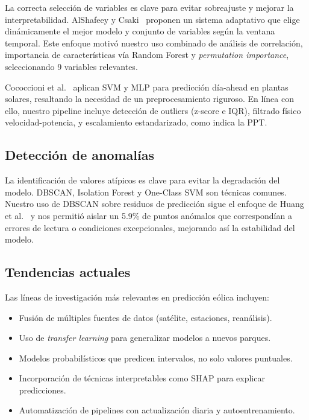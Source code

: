 \documentclass[conference]{IEEEtran}
\begin{document}
	La correcta selección de variables es clave para evitar sobreajuste y mejorar la interpretabilidad. AlShafeey y Csaki~\cite{alshafeey2024adaptive} proponen un sistema adaptativo que elige dinámicamente el mejor modelo y conjunto de variables según la ventana temporal. Este enfoque motivó nuestro uso combinado de análisis de correlación, importancia de características vía Random Forest y \textit{permutation importance}, seleccionando 9 variables relevantes.
	
	Cococcioni et al.~\cite{cococcioni2012oneday} aplican SVM y MLP para predicción día-ahead en plantas solares, resaltando la necesidad de un preprocesamiento riguroso. En línea con ello, nuestro pipeline incluye detección de outliers (z-score e IQR), filtrado físico velocidad-potencia, y escalamiento estandarizado, como indica la PPT.
	
	\subsection{Detección de anomalías}
	
	La identificación de valores atípicos es clave para evitar la degradación del modelo. DBSCAN, Isolation Forest y One-Class SVM son técnicas comunes. Nuestro uso de DBSCAN sobre residuos de predicción sigue el enfoque de Huang et al.~\cite{huang2023ensemble} y nos permitió aislar un 5.9\% de puntos anómalos que correspondían a errores de lectura o condiciones excepcionales, mejorando así la estabilidad del modelo.
	
	\subsection{Tendencias actuales}
	
	Las líneas de investigación más relevantes en predicción eólica incluyen:
	
	\begin{itemize}
		\item Fusión de múltiples fuentes de datos (satélite, estaciones, reanálisis).
		\item Uso de \textit{transfer learning} para generalizar modelos a nuevos parques.
		\item Modelos probabilísticos que predicen intervalos, no solo valores puntuales.
		\item Incorporación de técnicas interpretables como SHAP para explicar predicciones.
		\item Automatización de pipelines con actualización diaria y autoentrenamiento.
	\end{itemize}
	
\end{document}
